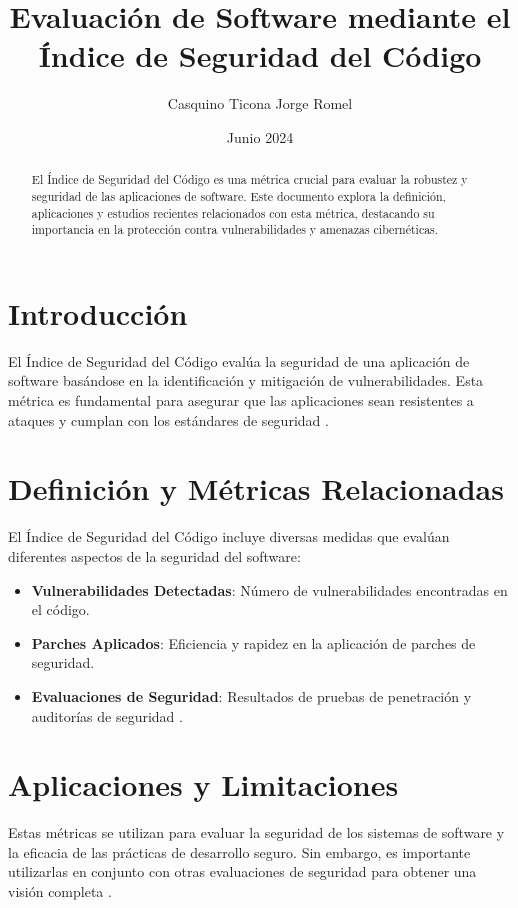 \documentclass{article}
\title{Evaluación de Software mediante el Índice de Seguridad del Código}
\author{Casquino Ticona Jorge Romel}
\date{Junio 2024}
\begin{document}
\maketitle

\begin{abstract}
El Índice de Seguridad del Código es una métrica crucial para evaluar la robustez y seguridad de las aplicaciones de software. Este documento explora la definición, aplicaciones y estudios recientes relacionados con esta métrica, destacando su importancia en la protección contra vulnerabilidades y amenazas cibernéticas.
\end{abstract}

\section{Introducción}
El Índice de Seguridad del Código evalúa la seguridad de una aplicación de software basándose en la identificación y mitigación de vulnerabilidades. Esta métrica es fundamental para asegurar que las aplicaciones sean resistentes a ataques y cumplan con los estándares de seguridad \citep{xu2023}.

\section{Definición y Métricas Relacionadas}
El Índice de Seguridad del Código incluye diversas medidas que evalúan diferentes aspectos de la seguridad del software:
\begin{itemize}
    \item \textbf{Vulnerabilidades Detectadas}: Número de vulnerabilidades encontradas en el código.
    \item \textbf{Parches Aplicados}: Eficiencia y rapidez en la aplicación de parches de seguridad.
    \item \textbf{Evaluaciones de Seguridad}: Resultados de pruebas de penetración y auditorías de seguridad \citep{inderscience2023}.
\end{itemize}

\section{Aplicaciones y Limitaciones}
Estas métricas se utilizan para evaluar la seguridad de los sistemas de software y la eficacia de las prácticas de desarrollo seguro. Sin embargo, es importante utilizarlas en conjunto con otras evaluaciones de seguridad para obtener una visión completa \citep{nature2023}.
\end{document}
